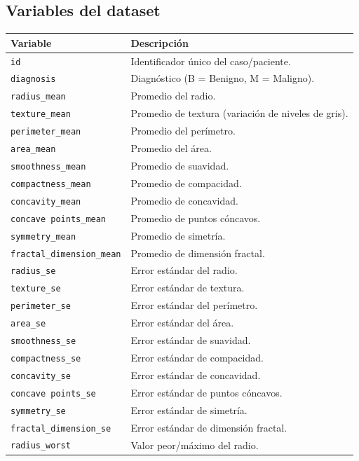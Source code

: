 \subsection{Variables del dataset}
\begin{longtable}{p{} p{}}
\toprule
\textbf{Variable} & \textbf{Descripción} \\
\midrule
\endhead
\texttt{id} & Identificador único del caso/paciente. \\
\texttt{diagnosis} & Diagnóstico (B = Benigno, M = Maligno). \\
\texttt{radius\_mean} & Promedio del radio. \\
\texttt{texture\_mean} & Promedio de textura (variación de niveles de gris). \\
\texttt{perimeter\_mean} & Promedio del perímetro. \\
\texttt{area\_mean} & Promedio del área. \\
\texttt{smoothness\_mean} & Promedio de suavidad. \\
\texttt{compactness\_mean} & Promedio de compacidad. \\
\texttt{concavity\_mean} & Promedio de concavidad. \\
\texttt{concave points\_mean} & Promedio de puntos cóncavos. \\
\texttt{symmetry\_mean} & Promedio de simetría. \\
\texttt{fractal\_dimension\_mean} & Promedio de dimensión fractal. \\
\texttt{radius\_se} & Error estándar del radio. \\
\texttt{texture\_se} & Error estándar de textura. \\
\texttt{perimeter\_se} & Error estándar del perímetro. \\
\texttt{area\_se} & Error estándar del área. \\
\texttt{smoothness\_se} & Error estándar de suavidad. \\
\texttt{compactness\_se} & Error estándar de compacidad. \\
\texttt{concavity\_se} & Error estándar de concavidad. \\
\texttt{concave points\_se} & Error estándar de puntos cóncavos. \\
\texttt{symmetry\_se} & Error estándar de simetría. \\
\texttt{fractal\_dimension\_se} & Error estándar de dimensión fractal. \\
\texttt{radius\_worst} & Valor peor/máximo del radio. \\

\end{longtable}
